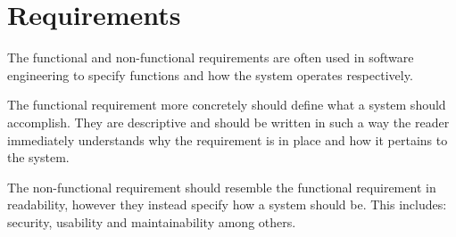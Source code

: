 \chapter{Requirements}
The functional and non-functional requirements are often used in software engineering to specify functions and how the system operates respectively. 

The functional requirement more concretely should define what a system should accomplish. They are descriptive and should be written in such a way the reader immediately understands why the requirement is in place and how it pertains to the system.

The non-functional requirement should resemble the functional requirement in readability, however they instead specify how a system should be. This includes: security, usability and maintainability among others.




